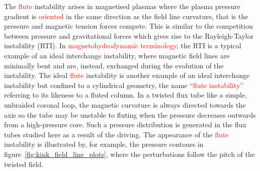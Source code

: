 \documentclass[12pt]{article}
\newcommand{\rs}[2]{\textcolor{red}{#2}}
\begin{document}
The \rs{fluting}{flute} instability arises in magnetised plasmas where
the plasma pressure gradient is \rs{directed}{oriented} in the same direction as the
field line curvature, that is the pressure and magnetic tension forces
compete. This is similar to the competition between pressure and
gravitational forces which gives rise to the Rayleigh-Taylor
instability (RTI). In \rs{MHD}{magnetohydrodynamic terminology}, the RTI is a typical example of an ideal
interchange instability, where magnetic field lines are minimally bent
and are, instead, exchanged during the evolution of the
instability. The ideal \rs{fluting}{flute} instability is another example of an
ideal interchange instability but confined to a cylindrical geometry,
the name \rs{``fluting instability''}{``flute instability''} referring to its likeness to a fluted
column. In a twisted flux tube like a simple, unbraided coronal loop,
the magnetic curvature is always directed towards the axis so the tube
may be unstable to fluting when the pressure decreases outwards from a
high-pressure core. Such a pressure distribution is generated in the
flux tubes studied here as a result of the driving. The appearance of
the \rs{fluting}{flute} instability is illustrated by, for example, the pressure
contours in figure~\ref{fig:kink_field_line_plots}, where the
perturbations follow the pitch of the twisted field. 
\end{document}
